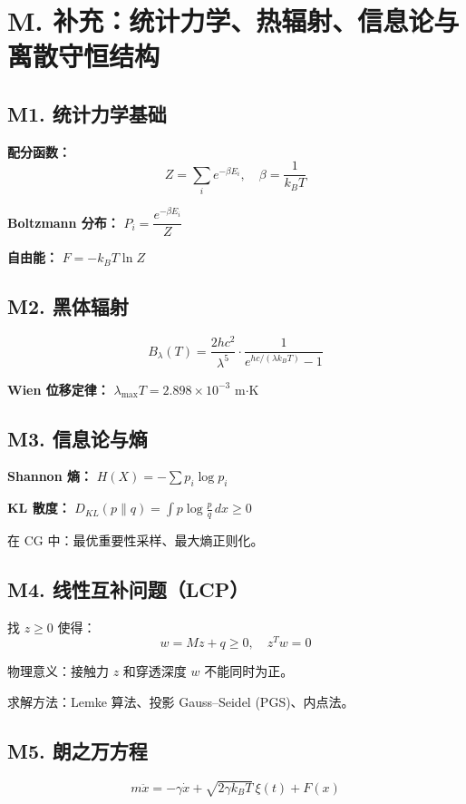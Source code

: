 \section{M. 补充：统计力学、热辐射、信息论与离散守恒结构}

\subsection{M1. 统计力学基础}

\textbf{配分函数：}
\[
Z = \sum_i e^{-\beta E_i}, \quad \beta = \frac{1}{k_B T}
\]

\textbf{Boltzmann 分布：} $P_i = \dfrac{e^{-\beta E_i}}{Z}$

\textbf{自由能：} $F = -k_B T \ln Z$

\subsection{M2. 黑体辐射}

\[
B_\lambda(T) = \frac{2hc^2}{\lambda^5} \cdot \frac{1}{e^{hc/(\lambda k_B T)} - 1}
\]

\textbf{Wien 位移定律：} $\lambda_{\max} T = 2.898 \times 10^{-3}$ m$\cdot$K

\subsection{M3. 信息论与熵}

\textbf{Shannon 熵：} $H(X) = -\displaystyle\sum p_i \log p_i$

\textbf{KL 散度：} $D_{KL}(p\|q) = \displaystyle\int p\log\frac{p}{q}\,dx \geq 0$

在 CG 中：最优重要性采样、最大熵正则化。

\subsection{M4. 线性互补问题（LCP）}

找 $z \geq 0$ 使得：
\[
w = Mz + q \geq 0, \quad z^T w = 0
\]

物理意义：接触力 $z$ 和穿透深度 $w$ 不能同时为正。

求解方法：Lemke 算法、投影 Gauss--Seidel (PGS)、内点法。

\subsection{M5. 朗之万方程}

\[
m\ddot{x} = -\gamma\dot{x} + \sqrt{2\gamma k_B T}\,\xi(t) + F(x)
\]

